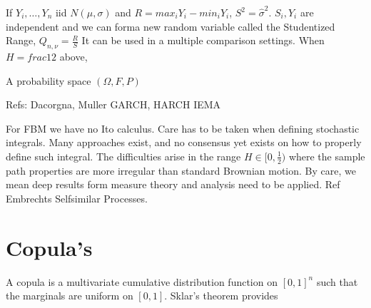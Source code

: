 If $Y_i, \hdots , Y_n$ iid $N(\mu,\sigma)$ and $R= max_i Y_i -
min_i Y_i$, $S^2=\widehat{\sigma}^2$.  $S_i, Y_i$ are
independent and we can forma new random variable called the
Studentized Range, $Q_{n,\nu}=\frac{R}{S}$  It can be used in a
multiple comparison settings.  When $H=frac{1}{2}$ above,

A probability space $ (\Omega, F, P)$


Refs: Dacorgna, Muller GARCH, HARCH IEMA

For FBM we have no Ito calculus.  Care has to be taken when
defining stochastic integrals. Many approaches exist, and no
consensus yet exists on how to properly define such integral.
The difficulties arise in the range $H \in [0, \frac{1}{2})$
where the sample path properties are more irregular than
standard Brownian motion.  By care, we mean deep results form
measure theory and analysis need to be applied.  Ref Embrechts
Selfsimilar Processes.


\section{Copula's }
A copula is a multivariate cumulative distribution function on
$[0, 1]^n$ such that the marginals are uniform on $[0, 1]$.
Sklar's theorem provides

%

